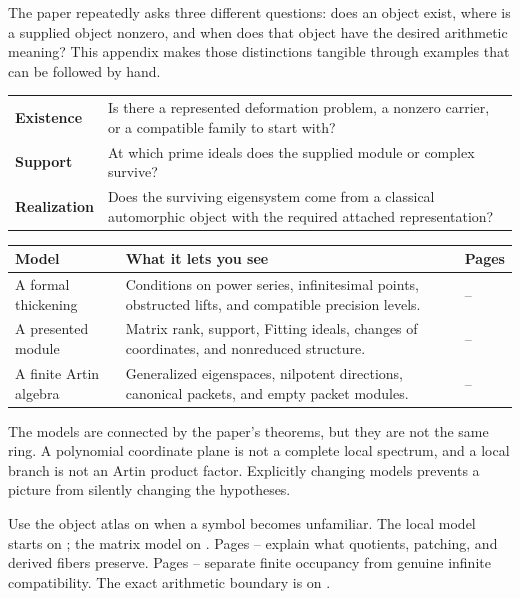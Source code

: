 The paper repeatedly asks three different questions: does an object exist, where is a supplied object nonzero, and when does that object have the desired arithmetic meaning? This appendix makes those distinctions tangible through examples that can be followed by hand.

\begin{insight}
\begin{tabularx}{\linewidth}{@{}p{.18\linewidth}Y@{}}
\textbf{Existence} & Is there a represented deformation problem, a nonzero carrier, or a compatible family to start with?\\[3pt]
\textbf{Support} & At which prime ideals does the supplied module or complex survive?\\[3pt]
\textbf{Realization} & Does the surviving eigensystem come from a classical automorphic object with the required attached representation?
\end{tabularx}
\end{insight}

\begin{tabularx}{\linewidth}{@{}p{.20\linewidth}Y>{\raggedright\arraybackslash}p{.15\linewidth}@{}}\toprule
\textbf{Model} & \textbf{What it lets you see} & \textbf{Pages}\\\midrule
A formal thickening & Conditions on power series, infinitesimal points, obstructed lifts, and compatible precision levels. & --\\
A presented module & Matrix rank, support, Fitting ideals, changes of coordinates, and nonreduced structure. & --\\
A finite Artin algebra & Generalized eigenspaces, nilpotent directions, canonical packets, and empty packet modules. & --\\\bottomrule
\end{tabularx}

The models are connected by the paper's theorems, but they are not the same ring. A polynomial coordinate plane is not a complete local spectrum, and a local branch is not an Artin product factor. Explicitly changing models prevents a picture from silently changing the hypotheses.

Use the object atlas on  when a symbol becomes unfamiliar. The local model starts on ; the matrix model on . Pages -- explain what quotients, patching, and derived fibers preserve. Pages -- separate finite occupancy from genuine infinite compatibility. The exact arithmetic boundary is on .

